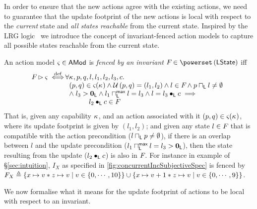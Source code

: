 In order to ensure that the new actions agree with the existing actions, we need to guarantee that the update footprint of the new actions is local with respect to the \emph{current} state and \emph{all states reachable} from the current state. Inspired by the LRG logic~\cite{lrg} we introduce the concept of invariant-fenced action models to capture all possible states reachable from the current state.
%
\begin{definition}
An action model $\varsigma_{} \in \textsf{AMod}$ is \emph{fenced by an invariant} $\fence{} \in \pset{\LStates}$ iff
%
\[
\hspace*{-0.15cm}
\begin{array}{l l}
	\fence{} \fences \amod{} \iffdef \hspace*{-0.2cm}
	 &\hspace*{-0.2cm} \for{\ca{}, p, q, l, l_1, l_2, l_3, c}\\
	 
	 & 
	 	(p, q) \in \amod{}(\ca{}) 
	 	\land \updateFP{p, q} = (l_1, l_2) \land
	 	l \in \fence{} \land
	 	p \meetL l \not= \emptyset \\
	 	
	 & 
	 	\land\; l_3 > \unitL \land
	 	 l_1 \maxMeetL l = l_3 \land
	 	 l = l_3 \composeL c
	 	 \implies\\
	 	 
	 & \hspace*{1cm} l_2 \composeL c \in \fence{}	 
\end{array}
\]
%
That is, given any capability $\kappa_{}$, and an action associated with it $(p, q) \in \varsigma_{}(\kappa_{})$, where its update footprint is given by $(l_1, l_2)$; and given any state $l \in F_{}$ that is compatible with the action precondition ($l \sqcap_{\textsf{L}} p \not= \emptyset$), if there is an overlap between $l$ and the update precondition ($l_1 \sqcap_{\textsf{L}}^{\textsf{max}} l = l_3 > \mathbf{0}_{\textsf{L}}$), then the state resulting from the update ($l_2 \bullet_{\textsf{L}} c$) is also in $F_{}$.
For instance in example of \S\ref{sec:intuition}, $I_X$ as specified in \fig\ref{fig:concurrentIncSubjectiveSpec} is fenced by $F_{X} \triangleq \left\{x \mapsto v * z \mapsto v \mid v \in \{0, \cdots, 10\} \right\} \cup \left\{x \mapsto v+1 * z \mapsto v \mid v \in \{0 ,\cdots, 9 \}\right\}$.
% 
\end{definition}
%
%
We now formalise what it means for the update footprint of actions to be local with respect to an invariant.
%
